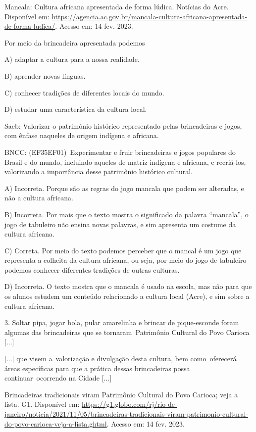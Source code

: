 Mancala: Cultura africana apresentada de forma lúdica. Notícias do Acre.
Disponível em:
\url{https://agencia.ac.gov.br/mancala-cultura-africana-apresentada-de-forma-ludica/}.
Acesso em: 14 fev. 2023.

Por meio da brincadeira apresentada podemos

A) adaptar a cultura para a nossa realidade.

B) aprender novas línguas.

C) conhecer tradições de diferentes locais do mundo.

D) estudar uma característica da cultura local.

Saeb: Valorizar o patrimônio histórico representado pelas brincadeiras e
jogos, com ênfase naqueles de origem indígena e africana.

BNCC: (EF35EF01)~Experimentar e fruir brincadeiras e jogos populares do
Brasil e do mundo, incluindo aqueles de matriz indígena e africana, e
recriá-los, valorizando a importância desse patrimônio histórico
cultural.

A) Incorreta. Porque são as regras do jogo mancala que podem ser
alteradas, e não a cultura africana.

B) Incorreta. Por mais que o texto mostra o significado da palavra
``mancala'', o jogo de tabuleiro não ensina novas palavras, e sim
apresenta um costume da cultura africana.

C) Correta. Por meio do texto podemos perceber que o mancal é um jogo
que representa a colheita da cultura africana, ou seja, por meio do jogo
de tabuleiro podemos conhecer diferentes tradições de outras culturas.

D) Incorreta. O texto mostra que o mancala é usado na escola, mas não
para que os alunos estudem um conteúdo relacionado a cultura local
(Acre), e sim sobre a cultura africana.

3. Soltar pipa, jogar bola, pular amarelinha e brincar de pique-esconde
foram algumas das brincadeiras que se tornaram~Patrimônio Cultural do
Povo Carioca {[}...{]}

{[}...{]} que visem a~valorização e divulgação desta cultura, bem
como~oferecerá áreas específicas para que a prática dessas brincadeiras
possa continuar~ocorrendo na Cidade {[}...{]}

Brincadeiras tradicionais viram Patrimônio Cultural do Povo Carioca;
veja a lista. G1. Disponível em:
\url{https://g1.globo.com/rj/rio-de-janeiro/noticia/2021/11/05/brincadeiras-tradicionais-viram-patrimonio-cultural-do-povo-carioca-veja-a-lista.ghtml}.
Acesso em: 14 fev. 2023.

